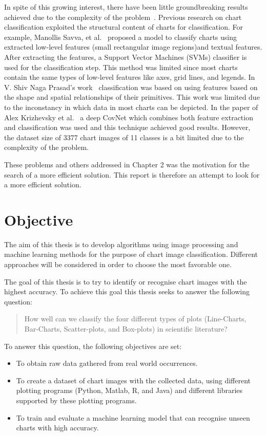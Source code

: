 \documentclass[12pt, a4paper,oneside]{report}
\begin{document}
In spite of this growing interest, there have been little groundbreaking results achieved due to the complexity of the problem~\cite{liu2015chart}. Previous research on chart classification exploited the structural content of charts for classification. For example, Manollis Savva, et al.~\cite{savva2011revision} proposed a model to classify charts using extracted low-level features (small rectangular image regions)and textual features. After extracting the features, a  Support Vector Machines (SVMs) classifier is used for the classification step. This method was limited since most charts contain the same types of low-level features like axes, grid lines, and legends. In V. Shiv Naga Prasad's work~ \cite{prasad2007classifying} classification was based on using features based on the shape and spatial relationships of their primitives. This work was limited due to the inconstancy in which data in most charts can be depicted. In the paper of Alex Krizhevsky et al.~\cite{krizhevsky2012imagenet} a deep CovNet which combines both feature extraction and classification was used and this technique achieved good results. However, the dataset size of 3377 chart images of 11 classes is a bit limited due to the complexity of the problem. 

These problems and others addressed in Chapter 2 was the motivation for the search of a more efficient solution. This report is therefore an attempt to look for a more efficient solution.

\section{Objective}
The aim of this thesis is to develop algorithms using image processing and machine learning methods for the purpose of chart image classification. Different approaches will be considered in order to choose the most favorable one.

The goal of this thesis is to try to identify or recognise chart images with the highest accuracy. To achieve this goal this thesis seeks to answer the following question: \begin{quote} How well can we classify the four different types of plots (Line-Charts, Bar-Charts, Scatter-plots, and Box-plots) in scientific literature? \end{quote} 
To answer this question, the following objectives are set:

\begin{itemize}\itemsep3pt
	\item To obtain raw data gathered from real world occurrences.
	\item To create a dataset of chart images with the collected data, using  different plotting programs (Python, Matlab, R, and Java) and different libraries supported by these plotting programs.
	\item To train and evaluate a machine learning model that can recognise unseen charts with high accuracy.
\end{itemize}
\end{document}
